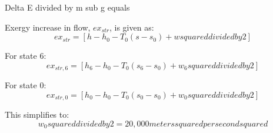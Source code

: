 Delta E divided by m sub g equals

Exergy increase in flow, \( ex_{str} \), is given as:  
\[ ex_{str} = [h - h_0 - T_0 (s - s_0) + w squared divided by 2] \]  

For state 6:  
\[ ex_{str,6} = [h_6 - h_0 - T_0 (s_6 - s_0) + w_6 squared divided by 2] \]  

For state 0:  
\[ ex_{str,0} = [h_0 - h_0 - T_0 (s_0 - s_0) + w_0 squared divided by 2] \]  

This simplifies to:  
\[ w_0 squared divided by 2 = 20,000 meters squared per second squared \]